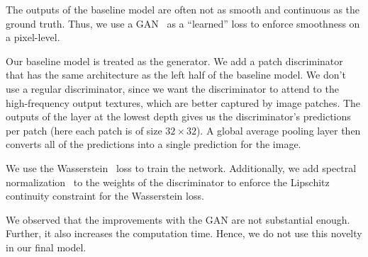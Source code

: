 The outputs of the baseline model are often not as smooth and continuous as the ground truth.
Thus, we use a GAN~\cite{gan} as a ``learned'' loss to enforce smoothness on a pixel-level.

Our baseline model is treated as the generator.
We add a patch discriminator~\cite{pix2pix} that has the same architecture as the left half of the baseline model.
We don't use a regular discriminator, since we want the discriminator to attend to the high-frequency output textures, which are better captured by image patches.
The outputs of the layer at the lowest depth gives us the discriminator's predictions per patch (here each patch is of size $32 \times 32$).
A global average pooling layer then converts all of the predictions into a single prediction for the image.

We use the Wasserstein~\cite{wgan} loss to train the network.
Additionally, we add spectral normalization~\cite{spectral-norm} to the weights of the discriminator to enforce the Lipschitz continuity constraint for the Wasserstein loss.

We observed that the improvements with the GAN are not substantial enough.
Further, it also increases the computation time.
Hence, we do not use this novelty in our final model.
